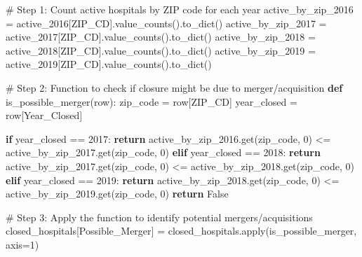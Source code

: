 \documentclass[
  letterpaper,
  DIV=11,
  numbers=noendperiod]{scrartcl}
\newenvironment{Shaded}{\begin{snugshade}}{\end{snugshade}}
\newcommand{\BuiltInTok}[1]{\textcolor[rgb]{0.00,0.23,0.31}{#1}}
\newcommand{\CommentTok}[1]{\textcolor[rgb]{0.37,0.37,0.37}{#1}}
\newcommand{\ControlFlowTok}[1]{\textcolor[rgb]{0.00,0.23,0.31}{\textbf{#1}}}
\newcommand{\DecValTok}[1]{\textcolor[rgb]{0.68,0.00,0.00}{#1}}
\newcommand{\KeywordTok}[1]{\textcolor[rgb]{0.00,0.23,0.31}{\textbf{#1}}}
\newcommand{\NormalTok}[1]{\textcolor[rgb]{0.00,0.23,0.31}{#1}}
\newcommand{\OperatorTok}[1]{\textcolor[rgb]{0.37,0.37,0.37}{#1}}
\newcommand{\StringTok}[1]{\textcolor[rgb]{0.13,0.47,0.30}{#1}}
\newcommand{\VariableTok}[1]{\textcolor[rgb]{0.07,0.07,0.07}{#1}}
\begin{document}
\begin{Shaded}
\begin{Highlighting}[]
\CommentTok{\# Step 1: Count active hospitals by ZIP code for each year}
\NormalTok{active\_by\_zip\_2016 }\OperatorTok{=}\NormalTok{ active\_2016[}\StringTok{\textquotesingle{}ZIP\_CD\textquotesingle{}}\NormalTok{].value\_counts().to\_dict()}
\NormalTok{active\_by\_zip\_2017 }\OperatorTok{=}\NormalTok{ active\_2017[}\StringTok{\textquotesingle{}ZIP\_CD\textquotesingle{}}\NormalTok{].value\_counts().to\_dict()}
\NormalTok{active\_by\_zip\_2018 }\OperatorTok{=}\NormalTok{ active\_2018[}\StringTok{\textquotesingle{}ZIP\_CD\textquotesingle{}}\NormalTok{].value\_counts().to\_dict()}
\NormalTok{active\_by\_zip\_2019 }\OperatorTok{=}\NormalTok{ active\_2019[}\StringTok{\textquotesingle{}ZIP\_CD\textquotesingle{}}\NormalTok{].value\_counts().to\_dict()}

\CommentTok{\# Step 2: Function to check if closure might be due to merger/acquisition}
\KeywordTok{def}\NormalTok{ is\_possible\_merger(row):}
\NormalTok{    zip\_code }\OperatorTok{=}\NormalTok{ row[}\StringTok{\textquotesingle{}ZIP\_CD\textquotesingle{}}\NormalTok{]}
\NormalTok{    year\_closed }\OperatorTok{=}\NormalTok{ row[}\StringTok{\textquotesingle{}Year\_Closed\textquotesingle{}}\NormalTok{]}
    
    \ControlFlowTok{if}\NormalTok{ year\_closed }\OperatorTok{==} \DecValTok{2017}\NormalTok{:}
        \ControlFlowTok{return}\NormalTok{ active\_by\_zip\_2016.get(zip\_code, }\DecValTok{0}\NormalTok{) }\OperatorTok{\textless{}=}\NormalTok{ active\_by\_zip\_2017.get(zip\_code, }\DecValTok{0}\NormalTok{)}
    \ControlFlowTok{elif}\NormalTok{ year\_closed }\OperatorTok{==} \DecValTok{2018}\NormalTok{:}
        \ControlFlowTok{return}\NormalTok{ active\_by\_zip\_2017.get(zip\_code, }\DecValTok{0}\NormalTok{) }\OperatorTok{\textless{}=}\NormalTok{ active\_by\_zip\_2018.get(zip\_code, }\DecValTok{0}\NormalTok{)}
    \ControlFlowTok{elif}\NormalTok{ year\_closed }\OperatorTok{==} \DecValTok{2019}\NormalTok{:}
        \ControlFlowTok{return}\NormalTok{ active\_by\_zip\_2018.get(zip\_code, }\DecValTok{0}\NormalTok{) }\OperatorTok{\textless{}=}\NormalTok{ active\_by\_zip\_2019.get(zip\_code, }\DecValTok{0}\NormalTok{)}
    \ControlFlowTok{return} \VariableTok{False}

\CommentTok{\# Step 3: Apply the function to identify potential mergers/acquisitions}
\NormalTok{closed\_hospitals[}\StringTok{\textquotesingle{}Possible\_Merger\textquotesingle{}}\NormalTok{] }\OperatorTok{=}\NormalTok{ closed\_hospitals.}\BuiltInTok{apply}\NormalTok{(is\_possible\_merger, axis}\OperatorTok{=}\DecValTok{1}\NormalTok{)}


\end{Highlighting}
\end{Shaded}
\end{document}
